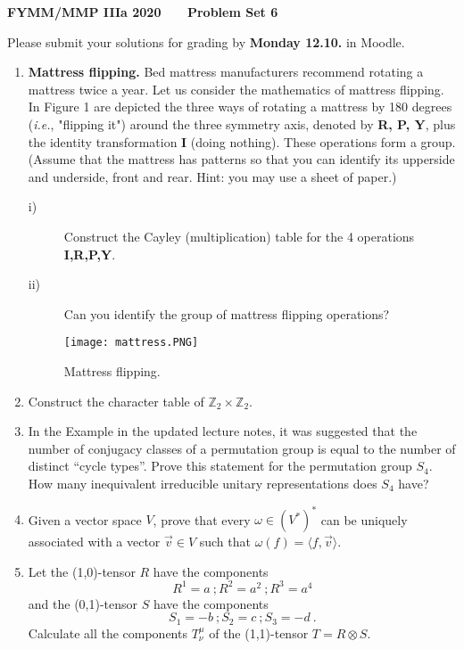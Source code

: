 \documentclass[12pt]{article}
\newcommand{\bra}{\langle}
\newcommand{\ket}{\rangle}
\begin{document}
\normalsize

\baselineskip 14pt

\begin{center}
{\Large {\bf FYMM/MMP IIIa 2020 \ \ \  Problem Set 6}}
\end{center}

\bigskip

\noindent
Please submit your solutions for grading by \textbf{Monday 12.10.} in Moodle.


\begin{enumerate}
\item {\bf Mattress flipping.}
Bed mattress manufacturers recommend rotating a mattress twice a year. Let us consider 
the mathematics of mattress flipping. In Figure 1 are depicted the three ways of rotating a 
mattress by 180 degrees ({\em i.e.}, "flipping it") around the three symmetry axis, denoted
by {\bf R, P, Y}, plus the identity transformation {\bf I} (doing nothing). These operations form a group. 
(Assume that the mattress has patterns so that you can identify its upperside and underside, front and rear. Hint: you may use a sheet of paper.)
\begin{description}
\item [i)] Construct the Cayley (multiplication) table for the 4 operations {\bf I,R,P,Y}. 
\item [ii)] Can you identify the group of mattress flipping operations?
\end{description}
\begin{figure}[h]
\begin{center}
\texttt{[image: mattress.PNG]}
\caption{Mattress flipping.}
\end{center}
\end{figure}

\item Construct the character table of $\mathbb{Z}_2\times \mathbb{Z}_2$.

\item In the Example in the updated lecture notes, it was suggested that the number of conjugacy classes of a permutation group is equal to the number of distinct ``cycle types''.  Prove this statement for 
the permutation group $S_4$.  How many inequivalent irreducible unitary representations does $S_4$ have?

\item Given a vector space $V$, prove that every $\omega \in (V^*)^*$ can be uniquely associated with a vector $\vec{v}\in V$ such that $\omega (f)= \bra f , \vec{v}\ket$.

\item Let the (1,0)-tensor $R$
have the components
$$
R^1=a \ ; R^2 = a^2 \ ; R^3 = a^4 
$$
and the (0,1)-tensor $S$
have the components
$$
S_1=-b \ ; S_2 = c \ ; S_3 =- d \ . 
$$
Calculate all the components $T^\mu_\nu$ of the (1,1)-tensor $T=R\otimes S$.


\end{enumerate}
\end{document}
